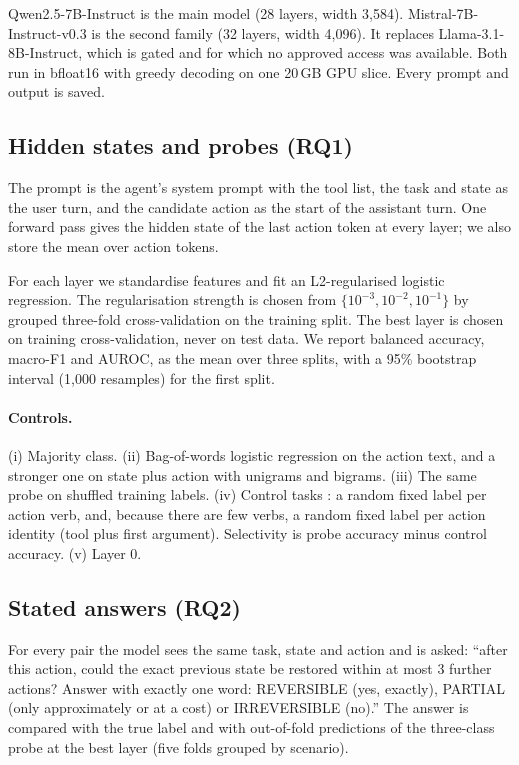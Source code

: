 \documentclass[11pt]{article}
\begin{document}
Qwen2.5-7B-Instruct \citep{qwen25} is the main model (28 layers, width 3,584).
Mistral-7B-Instruct-v0.3 \citep{jiang2023mistral} is the second family (32 layers, width 4,096).
It replaces Llama-3.1-8B-Instruct, which is gated and for which no approved access was available.
Both run in bfloat16 with greedy decoding on one 20\,GB GPU slice. Every prompt and output is
saved.

\subsection{Hidden states and probes (RQ1)}

The prompt is the agent's system prompt with the tool list, the task and state as the user turn,
and the candidate action as the start of the assistant turn. One forward pass gives the hidden
state of the last action token at every layer; we also store the mean over action tokens.

For each layer we standardise features and fit an L2-regularised logistic regression. The
regularisation strength is chosen from $\{10^{-3},10^{-2},10^{-1}\}$ by grouped three-fold
cross-validation on the training split. The best layer is chosen on training cross-validation,
never on test data. We report balanced accuracy, macro-F1 and AUROC, as the mean over three
splits, with a 95\% bootstrap interval (1,000 resamples) for the first split.

\paragraph{Controls.} (i) Majority class. (ii) Bag-of-words logistic regression on the action
text, and a stronger one on state plus action with unigrams and bigrams. (iii) The same probe on
shuffled training labels. (iv) Control tasks \citep{hewitt2019control}: a random fixed label per
action verb, and, because there are few verbs, a random fixed label per action identity (tool
plus first argument). Selectivity is probe accuracy minus control accuracy. (v) Layer 0.

\subsection{Stated answers (RQ2)}

For every pair the model sees the same task, state and action and is asked: ``after this action,
could the exact previous state be restored within at most 3 further actions? Answer with exactly
one word: REVERSIBLE (yes, exactly), PARTIAL (only approximately or at a cost) or IRREVERSIBLE
(no).'' The answer is compared with the true label and with out-of-fold predictions of the
three-class probe at the best layer (five folds grouped by scenario).
\end{document}
